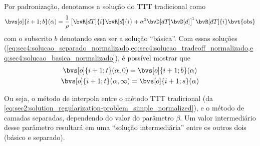 Por padronização, denotamos a solução do TTT tradicional como
\begin{equation}
	\bvs[o]{i+1;b}(\alpha) = \frac{1}{\rho} \inv*{\bvR[dT]{i} \bvR[d]{i} + \alpha^2 \bvD[dT] \bvD[d]} \bvR[dT]{i} \bvt{\obs}
	\label{eq:sec4:solucao_basica_normalizado}
\end{equation}
com o subscrito $b$ denotando essa ser a solução ``básica''. Com essas soluções (\cref{eq:sec4:solucao_separado_normalizado,eq:sec4:solucao_tradeoff_normalizado,eq:sec4:solucao_basica_normalizado}), é possível mostrar que
\begin{gather}
	\bvs[o]{i+1;t}(\alpha,0) = \bvs[o]{i+1;b}(\alpha) \\
	\bvs[o]{i+1;t}(\alpha,\infty) = \bvs[o]{i+1;s}(\alpha)
\end{gather}

Ou seja, o método de  interpola entre o método TTT tradicional (da \cref{eq:sec2:solution_regularization-problem_simple_normalized}), e o método de camadas separadas, dependendo do valor do parâmetro $\beta$. Um valor intermediário desse parâmetro resultará em uma ``solução intermediária'' entre os outros dois (básico e separado).